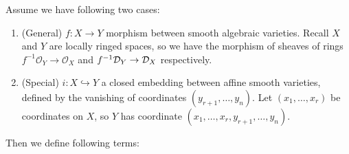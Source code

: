 \begin{remark}\label{rem:kashiwara_explicit}
    \mbox{}

    Assume we have following two cases:

    \begin{enumerate}
        \item (General) $f: X\to Y$ morphism between smooth algebraic varieties. Recall $X$ and $Y$ are locally ringed spaces, so we have the morphism of sheaves of rings $f^{-1}\mathcal{O}_Y \to \mathcal{O}_X$ and $f^{-1}\mathcal{D}_Y \to \mathcal{D}_X$ respectively.
        \item (Special) $i: X\hookrightarrow Y$ a closed embedding between affine smooth varieties, defined by the vanishing of coordinates $(y_{r+1}, \dots, y_{n})$. Let $(x_1, \dots, x_r)$ be coordinates on $X$, so $Y$ has coordinate $(x_1, \dots, x_r, y_{r+1}, \dots, y_{n})$.
    \end{enumerate}

    Then we define following terms:


\end{remark}
